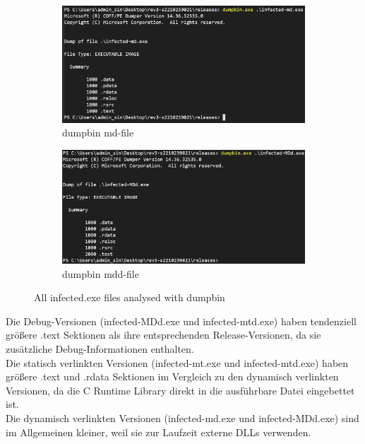 \documentclass{article}
\begin{document}
\begin{figure}[htp]
		\begin{subfigure}[b]{0.45\textwidth}
			\includegraphics[width=\textwidth]{pictures/1. dumpbin md.png}
			\caption{dumpbin md-file}
			\label{fig:image3}
		\end{subfigure}
		\hfill
		\begin{subfigure}[b]{0.45\textwidth}
			\includegraphics[width=\textwidth]{pictures/1. dumpbin mdd.png}
			\caption{dumpbin mdd-file}
			\label{fig:image4}
		\end{subfigure}
		\caption{All infected.exe files analysed with dumpbin}
		\label{fig:grid}
	\end{figure}
	
	\noindent Die Debug-Versionen (infected-MDd.exe und infected-mtd.exe) haben tendenziell größere .text Sektionen als ihre entsprechenden Release-Versionen, da sie zusätzliche Debug-Informationen enthalten.\\
	Die statisch verlinkten Versionen (infected-mt.exe und infected-mtd.exe) haben größere .text und .rdata Sektionen im Vergleich zu den dynamisch verlinkten Versionen, da die C Runtime Library direkt in die ausführbare Datei eingebettet ist.\\
	Die dynamisch verlinkten Versionen (infected-md.exe und infected-MDd.exe) sind im Allgemeinen kleiner, weil sie zur Laufzeit externe DLLs verwenden.\\
	
\end{document}
